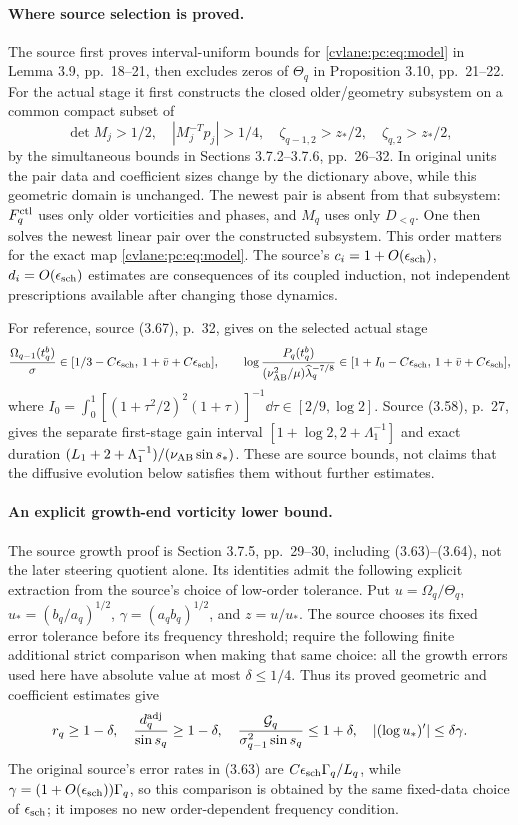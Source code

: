 \paragraph{Where source selection is proved.}
The source first proves interval-uniform bounds for \eqref{cvlane:pc:eq:model} in Lemma 3.9, pp.~18--21, then excludes zeros of $\Theta_q$ in Proposition 3.10, pp.~21--22. For the actual stage it first constructs the closed older/geometry subsystem on a common compact subset of
\[
 \det M_j>1/2,\quad |M_j^{-T}p_j|>1/4,\quad
 \zeta_{q-1,2}>z_*/2,\quad \zeta_{q,2}>z_*/2,
\]
by the simultaneous bounds in Sections 3.7.2--3.7.6, pp.~26--32. In original units the pair data and coefficient sizes change by the dictionary above, while this geometric domain is unchanged. The newest pair is absent from that subsystem: $F_q^{\rm ctl}$ uses only older vorticities and phases, and $M_q$ uses only $D_{<q}$. One then solves the newest linear pair over the constructed subsystem. This order matters for the exact map \eqref{cvlane:pc:eq:model}. The source's $c_i=1+O(\epsilon_{\rm sch})$, $d_i=O(\epsilon_{\rm sch})$ estimates are consequences of its coupled induction, not independent prescriptions available after changing those dynamics.

For reference, source (3.67), p.~32, gives on the selected actual stage
\[
 \frac{\Omega_{q-1}(t_q^b)}\sigma\in
 [1/3-C\epsilon_{\rm sch},\,1+\bar v+C\epsilon_{\rm sch}],\qquad
 \log\frac{P_q(t_q^b)}{(\nu_{\mathrm{AB}}^2/\mu)\widehat\lambda_q^{-7/8}}
 \in[1+I_0-C\epsilon_{\rm sch},\,1+\bar v+C\epsilon_{\rm sch}],
\]
where $I_0=\int_0^1[(1+\tau^2/2)^2(1+\tau)]^{-1}\dd\tau\in[2/9,\log2]$. Source (3.58), p.~27, gives the separate first-stage gain interval $[1+\log2,2+\Lambda_1^{-1}]$ and exact duration $(L_1+2+\Lambda_1^{-1})/(\nu_{\mathrm{AB}}\sin s_*)$. These are source bounds, not claims that the diffusive evolution below satisfies them without further estimates.

\paragraph{An explicit growth-end vorticity lower bound.}
The source growth proof is Section 3.7.5, pp.~29--30, including (3.63)--(3.64), not the later steering quotient alone. Its identities admit the following explicit extraction from the source's choice of low-order tolerance. Put $u=\Omega_q/\Theta_q$, $u_*=(b_q/a_q)^{1/2}$, $\gamma=(a_qb_q)^{1/2}$, and $z=u/u_*$. The source chooses its fixed error tolerance before its frequency threshold; require the following finite additional strict comparison when making that same choice: all the growth errors used here have absolute value at most $\delta\le1/4$. Thus its proved geometric and coefficient estimates give
\[
 r_q\ge1-\delta,\quad \frac{d_q^{\rm adj}}{\sin s_q}\ge1-\delta,\quad
 \frac{\mathcal G_q}{\sigma_{q-1}^2\sin s_q}\le1+\delta,\quad
 |(\log u_*)'|\le\delta\gamma.
\]
The original source's error rates in (3.63) are $C\epsilon_{\rm sch}\Gamma_q/L_q$, while $\gamma=(1+O(\epsilon_{\rm sch}))\Gamma_q$, so this comparison is obtained by the same fixed-data choice of $\epsilon_{\rm sch}$; it imposes no new order-dependent frequency condition.

